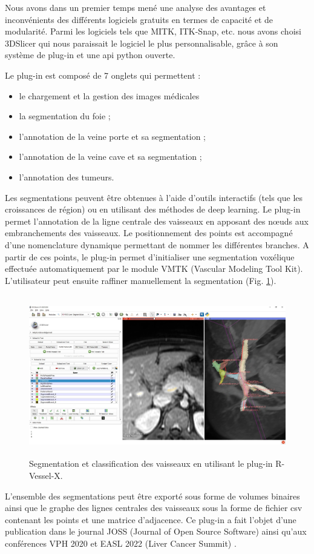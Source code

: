 Nous avons dans un premier temps mené une analyse des avantages et inconvénients des différents logiciels gratuits en termes de capacité et de modularité. Parmi les logiciels tels que MITK, ITK-Snap, etc. nous avons choisi 3DSlicer qui nous paraissait le logiciel le plus personnalisable, grâce à son système de plug-in et une api python ouverte.

Le plug-in est composé de 7 onglets qui permettent :

\begin{itemize}
    \item le chargement et la gestion des images médicales
    \item la segmentation du foie ;
    \item l'annotation de la veine porte et sa segmentation ;
    \item l'annotation de la veine cave et sa segmentation ;
    \item l'annotation des tumeurs.
\end{itemize}

Les segmentations peuvent être obtenues à l'aide d'outils interactifs (tels que les croissances de région) ou en utilisant des méthodes de deep learning. 
Le plug-in permet l'annotation de la ligne centrale des vaisseaux en apposant des nœuds aux embranchements des vaisseaux. Le positionnement des points est accompagné d'une nomenclature dynamique permettant de nommer les différentes branches. A partir de ces points, le plug-in permet d'initialiser une segmentation voxélique effectuée automatiquement par le module VMTK (Vascular Modeling Tool Kit). L'utilisateur peut ensuite raffiner manuellement la segmentation (Fig. \ref{fig:slicer_plug_in}).

\begin{figure}[H]
    \includegraphics[height=7cm]{Images/plug_in_segmentation.png}
    \caption{Segmentation et classification des vaisseaux en utilisant le plug-in R-Vessel-X.}
    \label{fig:slicer_plug_in}
\end{figure}

L'ensemble des segmentations peut être exporté sous forme de volumes binaires ainsi que le graphe des lignes centrales des vaisseaux sous la forme de fichier csv contenant les points et une matrice d'adjacence.
Ce plug-in a fait l'objet d'une publication dans le journal JOSS (Journal of Open Source Software) \cite{Lamy2022_JOSS} ainsi qu'aux conférences VPH 2020 \cite{Lamy2020_VPH_plugin} et EASL 2022 (Liver Cancer Summit) \cite{Lamy2022_EASL}.




